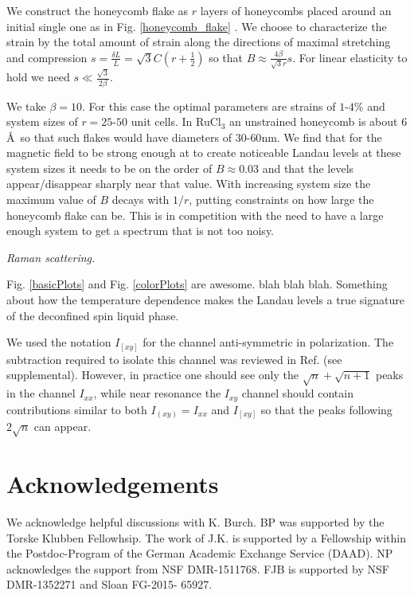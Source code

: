 \documentclass[reprint,amsmath,amssymb,aps,prl,groupedaddress,nofootinbib,superscriptaddress]{revtex4-1}
\newcommand{\1}{\mathds{1}}
\begin{document}
We construct the honeycomb flake as $r$ layers of honeycombs placed around an initial single one as in Fig. \ref{honeycomb_flake} \cite{Rachel15}. We choose to characterize the strain by the total amount of strain along the directions of maximal stretching and compression $s = \frac{\delta L}{L} = \sqrt{3}C(r+\frac{1}{2})$ so that $B \approx \frac{4\beta}{\sqrt{3}r}s$. For linear elasticity to hold we need $s \ll \frac{\sqrt{3}}{2\beta}$. 

We take $\beta = 10$. For this case the optimal parameters are strains of $1$-$4$\% and system sizes of $r = 25$-$50$ unit cells. In RuCl$_3$ an unstrained honeycomb is about $6$\AA \ so that such flakes would have diameters of $30$-$60$nm. 
We find that for the magnetic field to be strong enough at to create noticeable Landau levels at these system sizes it needs to be on the order of $B\approx 0.03$ and that the levels appear/disappear sharply near that value. With increasing system size the maximum value of $B$ decays with $1/r$, putting constraints on how large the honeycomb flake can be. This is in competition with the need to have a large enough system to get a spectrum that is not too noisy. 

{\it Raman scattering.} 

Fig. \ref{basicPlots} and Fig. \ref{colorPlots} are awesome. blah blah blah. Something about how the temperature dependence makes the Landau levels a true signature of the deconfined spin liquid phase.

We used the notation $I_{[xy]}$ for the channel anti-symmetric in polarization. The subtraction required to isolate this channel was reviewed in Ref. \cite{Perreault16-1} (see supplemental). However, in practice one should see only the $\sqrt{n} + \sqrt{n+1}$ peaks in the channel $I_{xx}$, while near resonance the $I_{xy}$ channel should contain contributions similar to both $I_{(xy)} = I_{xx}$ and $I_{[xy]}$ so that the peaks following $2\sqrt{n}$ can appear.



\section*{Acknowledgements}
We acknowledge helpful discussions with K. Burch. BP was supported by the Torske Klubben Fellowhsip. The work of J.K. is supported by a Fellowship within the Postdoc-Program of the German Academic Exchange Service (DAAD). NP acknowledges the support from NSF DMR-1511768. FJB is supported by NSF DMR-1352271 and Sloan FG-2015- 65927.
\end{document}
